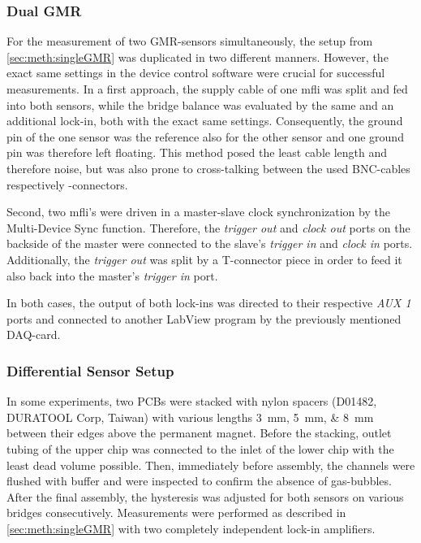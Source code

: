 \subsubsection{Dual GMR}
\label{sec:meth:dualGMR}
For the measurement of two GMR-sensors simultaneously, the setup from \ref{sec:meth:singleGMR} was duplicated in two different manners. However, the exact same settings in the device control software were crucial for successful measurements.  In a first approach, the supply cable of one \gls{mfli} was split and fed into both sensors, while the bridge balance was evaluated by the same and an additional lock-in, both with the exact same settings. Consequently, the ground pin of the one sensor was the reference also for the other sensor and one ground pin was therefore left floating. This method posed the least cable length and therefore noise, but was also prone to cross-talking between the used BNC-cables respectively -connectors.

Second, two \gls{mfli}'s were driven in a master-slave clock synchronization by the Multi-Device Sync function. Therefore, the \textit{trigger out} and \textit{clock out} ports on the backside of the master were connected to the slave's \textit{trigger in} and \textit{clock in} ports. Additionally, the \textit{trigger out} was split by a T-connector piece in order to feed it also back into the master's \textit{trigger in} port.

In both cases, the output of both lock-ins was directed to their respective \textit{AUX 1} ports and connected to another LabView program by the previously mentioned DAQ-card.

\subsubsection{Differential Sensor Setup}
In some experiments, two PCBs were stacked with nylon spacers (D01482, DURATOOL Corp, Taiwan) with various lengths \SIlist{3;5;8}{\milli\meter} between their edges above the permanent magnet. Before the stacking, outlet tubing of the upper chip was connected to the inlet of the lower chip with the least dead volume possible. Then, immediately before assembly, the channels were flushed with buffer and were inspected to confirm the absence of gas-bubbles. After the final assembly, the hysteresis was adjusted for both sensors on various bridges consecutively. Measurements were performed as described in \ref{sec:meth:singleGMR} with two completely independent lock-in amplifiers.


